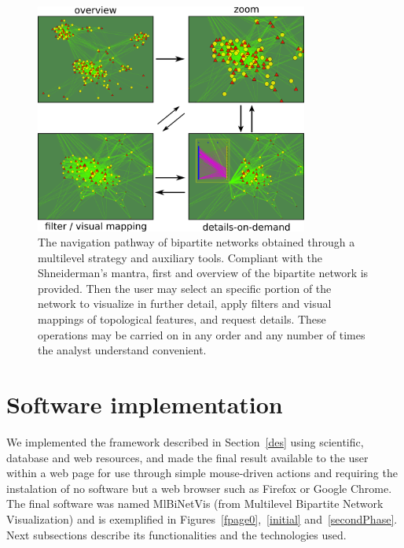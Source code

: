 \documentclass[runningheads]{llncs}
\begin{document}
\begin{figure}[!h]\centering
 \includegraphics[width=0.8\textwidth]{fnav___}
  \caption{The navigation pathway of bipartite networks obtained through a multilevel strategy
  and auxiliary tools.
  Compliant with the Shneiderman's mantra, first and overview of the bipartite network is provided.
  Then the user may select an specific portion of the network to visualize in further detail,
  apply filters and visual mappings of topological features, and request details.
  These operations may be carried on in any order and any number of times the analyst understand convenient.
  }\label{fnav}
\end{figure}

\noindent 
\section{Software implementation}\label{sof}
We implemented the framework described in Section~\ref{des} using scientific,
database and web resources,
and made the final result available to the user within a web page
for use through simple mouse-driven actions
and requiring the instalation of no software but a web browser such as Firefox or Google Chrome.
The final software was named MlBiNetVis (from Multilevel Bipartite Network Visualization)
and is exemplified in Figures~\ref{fpage0},~\ref{initial} and~\ref{secondPhase}.
Next subsections describe its functionalities and the technologies used.
\end{document}
